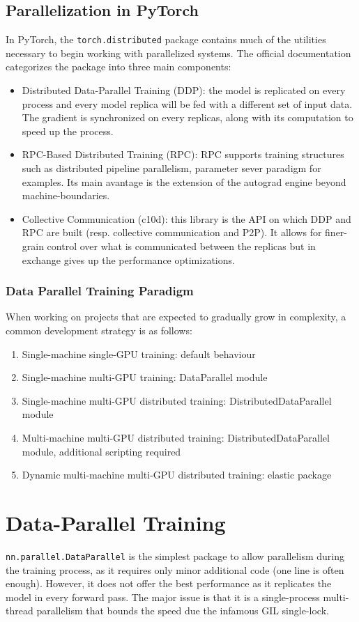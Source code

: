 \documentclass{article}
\begin{document}
\subsection{Parallelization in PyTorch}
In PyTorch, the \lstinline{torch.distributed} package contains much of the utilities necessary to begin working with parallelized systems. The official documentation categorizes the package into three main components:
\begin{itemize}
  \item Distributed Data-Parallel Training (DDP): the model is replicated on every process and every model replica will be fed with a different set of input data. The gradient is synchronized on every replicas, along with its computation to speed up the process.
  \item RPC-Based Distributed Training (RPC): RPC supports training structures such as distributed pipeline parallelism, parameter sever paradigm for examples. Its main avantage is the extension of the autograd engine beyond machine-boundaries.
  \item Collective Communication (c10d): this library is the API on which DDP and RPC are built (resp. collective communication and P2P). It allows for finer-grain control over what is communicated between the replicas but in exchange gives up the performance optimizations.
\end{itemize}

\subsubsection{Data Parallel Training Paradigm}
When working on projects that are expected to gradually grow in complexity, a common development strategy is as follows:
\begin{enumerate}
  \item Single-machine single-GPU training: default behaviour
  \item Single-machine multi-GPU training: DataParallel module
  \item Single-machine multi-GPU distributed training: DistributedDataParallel module
  \item Multi-machine multi-GPU distributed training: DistributedDataParallel module, additional scripting required
  \item Dynamic multi-machine multi-GPU distributed training: elastic package
\end{enumerate}

\section{Data-Parallel Training}
\lstinline{nn.parallel.DataParallel} is the simplest package to allow parallelism during the training process, as it requires only minor additional code (one line is often enough). However, it does not offer the best performance as it replicates the model in every forward pass. The major issue is that it is a single-process multi-thread parallelism that bounds the speed due the infamous \Gls{GIL} single-lock.
\end{document}
